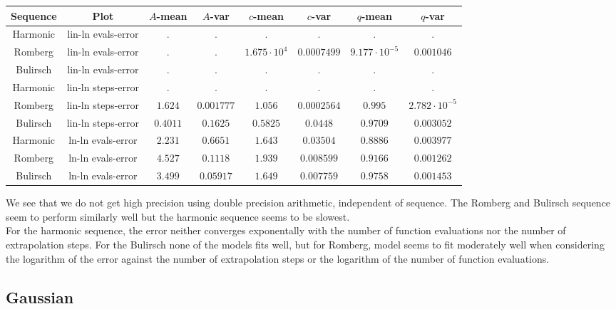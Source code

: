 \begin{table}[H]
    \centering
    \small
    \begin{tabular}{c|c||c|c|c|c|c	|c}
Sequence & Plot & \(A\)-mean & \(A\)-var & \(c\)-mean & \(c\)-var & \(q\)-mean & \(q\)-var\\\hline
Harmonic & lin-ln evals-error & . & . & . & . & . & . \\
Romberg & lin-ln evals-error & . & . & \(1.675\cdot 10^{4}\) & \(0.0007499\) & \(9.177\cdot 10^{-5}\) & \(0.001046\) \\
Bulirsch & lin-ln evals-error & . & . & . & . & . & . \\
Harmonic & lin-ln steps-error & . & . & . & . & . & . \\
Romberg & lin-ln steps-error & \(1.624\) & \(0.001777\) & \(1.056\) & \(0.0002564\) & \(0.995\) & \(2.782\cdot 10^{-5}\) \\
Bulirsch & lin-ln steps-error & \(0.4011\) & \(0.1625\) & \(0.5825\) & \(0.0448\) & \(0.9709\) & \(0.003052\) \\
Harmonic & ln-ln evals-error & \(2.231\) & \(0.6651\) & \(1.643\) & \(0.03504\) & \(0.8886\) & \(0.003977\) \\
Romberg & ln-ln evals-error & \(4.527\) & \(0.1118\) & \(1.939\) & \(0.008599\) & \(0.9166\) & \(0.001262\) \\
Bulirsch & ln-ln evals-error & \(3.499\) & \(0.05917\) & \(1.649\) & \(0.007759\) & \(0.9758\) & \(0.001453\) \\
    \end{tabular}
    \label{tab:my_label}
\end{table}

We see that we do not get high precision using double precision arithmetic, independent of sequence. The Romberg and Bulirsch sequence seem to perform similarly well but the harmonic sequence seems to be slowest.\\

For the harmonic sequence, the error neither converges exponentally with the number of function evaluations nor the number of extrapolation steps. For the Bulirsch none of the models fits well, but for Romberg, model seems to fit moderately well when considering the logarithm of the error against the number of extrapolation steps or the logarithm of the number of function evaluations.

\subsection{Gaussian}

